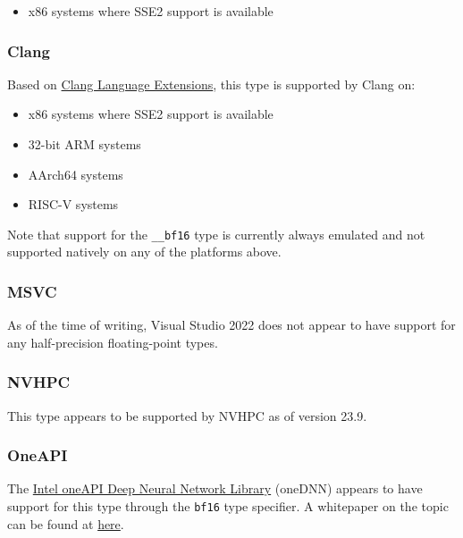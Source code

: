 \documentclass[../HDF5_RFC.tex]{subfiles}
\begin{document}
\begin{itemize}
    \item x86 systems where SSE2 support is available
\end{itemize}

\subsubsection{Clang}

Based on \href{https://clang.llvm.org/docs/LanguageExtensions.html#half-precision-floating-point}{Clang Language Extensions},
this type is supported by Clang on:

\begin{itemize}
    \item x86 systems where SSE2 support is available
    \item 32-bit ARM systems
    \item AArch64 systems
    \item RISC-V systems
\end{itemize}

Note that support for the \texttt{\_\_bf16} type is currently always emulated and not
supported natively on any of the platforms above.

\subsubsection{MSVC}

As of the time of writing, Visual Studio 2022 does not appear to have support for any half-precision floating-point types.

\subsubsection{NVHPC}

This type appears to be supported by NVHPC as of version 23.9.

\subsubsection{OneAPI}

The \href{https://www.intel.com/content/www/us/en/developer/tools/oneapi/onednn.html#gs.3ikawv}{Intel oneAPI Deep Neural Network Library}
(oneDNN) appears to have support for this type through the \texttt{bf16} type specifier. A whitepaper on the topic can be found at
\href{https://www.intel.com/content/dam/develop/external/us/en/documents/bf16-hardware-numerics-definition-white-paper.pdf}{here}.
\end{document}
